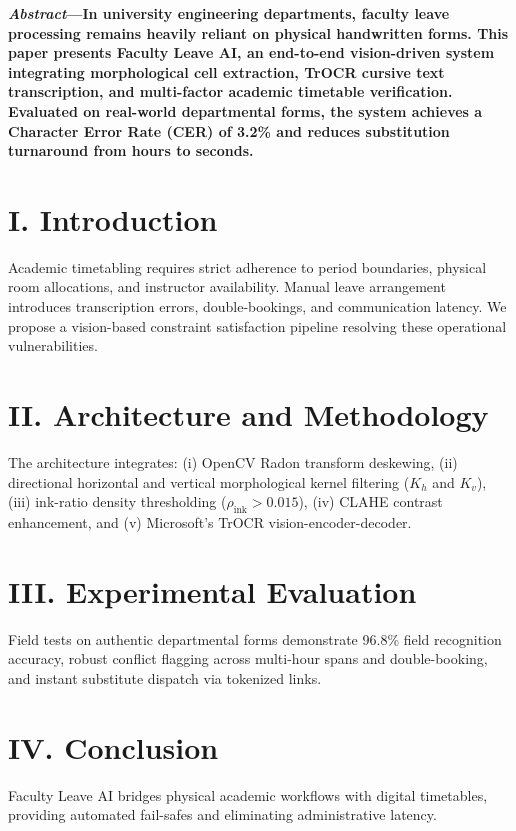 \documentclass[12pt,letterpaper]{report}
\begin{document}
\textbf{\textit{Abstract}---In university engineering departments, faculty leave processing remains heavily reliant on physical handwritten forms. This paper presents Faculty Leave AI, an end-to-end vision-driven system integrating morphological cell extraction, TrOCR cursive text transcription, and multi-factor academic timetable verification. Evaluated on real-world departmental forms, the system achieves a Character Error Rate (CER) of 3.2\% and reduces substitution turnaround from hours to seconds.}

\section*{I. Introduction}
Academic timetabling requires strict adherence to period boundaries, physical room allocations, and instructor availability. Manual leave arrangement introduces transcription errors, double-bookings, and communication latency. We propose a vision-based constraint satisfaction pipeline resolving these operational vulnerabilities.

\section*{II. Architecture and Methodology}
The architecture integrates: (i) OpenCV Radon transform deskewing, (ii) directional horizontal and vertical morphological kernel filtering ($K_h$ and $K_v$), (iii) ink-ratio density thresholding ($\rho_{\text{ink}} > 0.015$), (iv) CLAHE contrast enhancement, and (v) Microsoft's TrOCR vision-encoder-decoder.

\section*{III. Experimental Evaluation}
Field tests on authentic departmental forms demonstrate 96.8\% field recognition accuracy, robust conflict flagging across multi-hour spans and double-booking, and instant substitute dispatch via tokenized links.

\section*{IV. Conclusion}
Faculty Leave AI bridges physical academic workflows with digital timetables, providing automated fail-safes and eliminating administrative latency.

\end{document}
